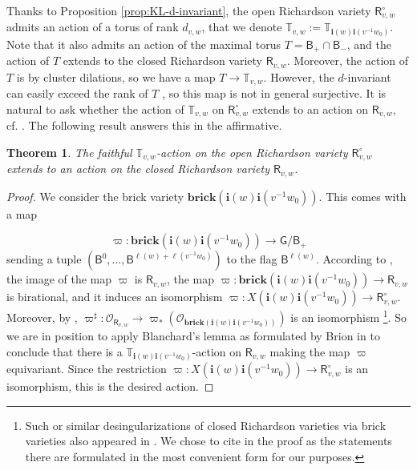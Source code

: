 \documentclass[a4paper, 11pt]{amsart}
\newcommand{\brick}{\mathbf{brick}}
\newcommand{\borel}{\mathsf{B}}
\newcommand{\flag}[1]{\mathsf{B}^{#1}}
\newcommand{\orich}[1]{\mathsf{R}^{\circ}_{#1}}
\newcommand{\rich}[1]{\mathsf{R}_{#1}}
\newcommand{\word}[1]{\mathbf{#1}}
\newcommand{\group}{\mathsf{G}}
\newcommand{\dil}[1]{\mathbb{T}_{#1}}
\newtheorem{theorem}{Theorem}[section]
\theoremstyle{definition}
\begin{document}
Thanks to Proposition \ref{prop:KL-d-invariant}, the open Richardson variety $\orich{v,w}$ admits an action of a torus of rank $d_{v,w}$, that we denote $\dil{v,w}:= \dil{\word{i}(w)\word{i}(v^{-1}w_0)}$. Note that it also admits an action of the maximal torus $T = \borel_{+}\cap \borel_{-}$, and the action of $T$ extends to the closed Richardson variety $\rich{v,w}$. Moreover, the action of $T$ is by cluster dilations, so we have a map $T \to \dil{v,w}$. However, the $d$-invariant can easily exceed the rank of $T$ \cite{hypercubes}, so this map is not in general surjective. It is natural to ask whether the action of $\dil{v,w}$ on $\orich{v,w}$ extends to an action on $\rich{v,w}$, cf. \cite[Question 1.6]{GKSB}. The following result answers this in the affirmative. 

\begin{theorem}\label{thm:action-extends-richardsons}
    The faithful $\dil{v,w}$-action on the open Richardson variety $\orich{v,w}$ extends to an action on the closed Richardson variety $\rich{v,w}$. 
\end{theorem}
\begin{proof}
We consider the brick variety $\brick(\word{i}(w)\word{i}(v^{-1}w_0))$. This comes with a map 

\[
\varpi: \brick(\word{i}(w)\word{i}(v^{-1}w_0)) \to \group/\borel_{+}
\]
sending a tuple $(\flag{0}, \dots, \flag{\ell(w) + \ell(v^{-1}w_0)})$ to the flag $\flag{\ell(w)}$. According  to \cite[Theorem A.1]{KLS_projections}, the image of the map $\varpi$ is $\rich{v,w}$, the map $\varpi: \brick(\word{i}(w)\word{i}(v^{-1}w_0)) \to \rich{v,w}$ is birational, and it induces an isomorphism $\varpi: X(\word{i}(w)\word{i}(v^{-1}w_0)) \to \orich{v,w}$. Moreover, by \cite[Theorem A.3]{KLS_projections}, $\varpi^{\sharp}: \mathcal{O}_{\rich{v,w}} \to \varpi_{\ast}(\mathcal{O}_{\brick(\word{i}(w)\word{i}(v^{-1}w_0))})$ is an isomorphism \footnote{Such or similar desingularizations of closed Richardson varieties via brick varieties also appeared in \cite{Brion_flags, Balan, escobar}. We chose to cite \cite{KLS_projections} in the proof as the statements there are formulated in the most convenient form for our purposes.}. So we are in position to apply Blanchard's lemma \cite{Blanchard} as formulated by Brion in \cite[Theorem 7.2.1]{Brion_structure} to conclude that there is a $\dil{\word{i}(w)\word{i}(v^{-1}w_0)}$-action on $\rich{v,w}$ making the map $\varpi$ equivariant. Since the restriction $\varpi: X(\word{i}(w)\word{i}(v^{-1}w_0)) \to \orich{v,w}$ is an isomorphism, this is the desired action.
\end{proof}
\end{document}
